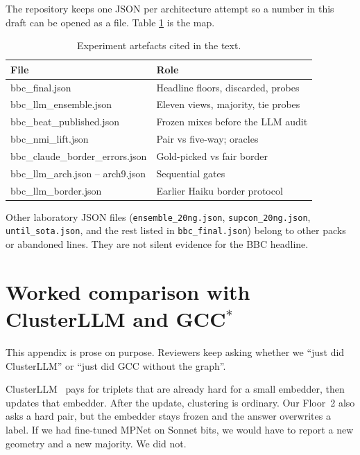 \documentclass[11pt,a4paper]{article}
\begin{document}
The repository keeps one JSON per architecture attempt so a
number in this draft can be opened as a file. Table
\ref{tab:json} is the map.

\begin{table}[t]
\centering
\caption{Experiment artefacts cited in the text.}
\label{tab:json}
\small
\begin{tabular}{>{\ttfamily}l>{\raggedright\arraybackslash}p{}}
\toprule
\normalfont File & Role \\
\midrule
bbc\_final.json & Headline floors, discarded, probes \\
bbc\_llm\_ensemble.json & Eleven views, majority, tie probes \\
bbc\_beat\_published.json & Frozen mixes before the LLM audit \\
bbc\_nmi\_lift.json & Pair vs five-way; oracles \\
bbc\_claude\_border\_errors.json & Gold-picked vs fair border \\
bbc\_llm\_arch.json -- arch9.json & Sequential gates \\
bbc\_llm\_border.json & Earlier Haiku border protocol \\
\bottomrule
\end{tabular}
\end{table}

Other laboratory JSON files (\texttt{ensemble\_20ng.json},
\texttt{supcon\_20ng.json}, \texttt{until\_sota.json}, and the
rest listed in \texttt{bbc\_final.json}) belong to other packs
or abandoned lines. They are not silent evidence for the BBC
headline.

\section{Worked comparison with ClusterLLM and GCC$^*$}

This appendix is prose on purpose. Reviewers keep asking
whether we ``just did ClusterLLM'' or ``just did GCC without
the graph''.

ClusterLLM~\cite{zhang2023clusterllm} pays for triplets that
are already hard for a small embedder, then updates that
embedder. After the update, clustering is ordinary. Our
Floor~2 also asks a hard pair, but the embedder stays frozen
and the answer overwrites a label. If we had fine-tuned
MPNet on Sonnet bits, we would have to report a new geometry
and a new majority. We did not.
\end{document}
